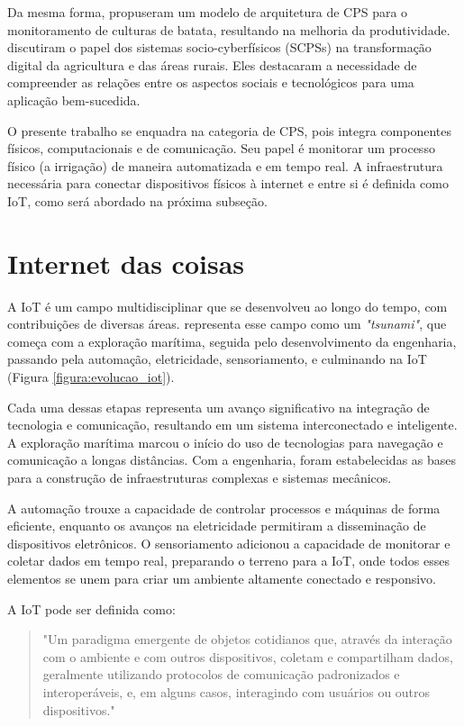 Da mesma forma, \textcite{rad2015smart} propuseram um modelo de arquitetura de CPS para o monitoramento de culturas de batata, resultando na melhoria da produtividade. \textcite{rijswijk2021digital} discutiram o papel dos sistemas socio-cyberfísicos (SCPSs) na transformação digital da agricultura e das áreas rurais. Eles destacaram a necessidade de compreender as relações entre os aspectos sociais e tecnológicos para uma aplicação bem-sucedida.

O presente trabalho se enquadra na categoria de CPS, pois integra componentes físicos, computacionais e de comunicação. Seu papel é monitorar um processo físico (a irrigação) de maneira automatizada e em tempo real. A infraestrutura necessária para conectar dispositivos físicos à internet e entre si é definida como IoT, como será abordado na próxima subseção. 

\section{Internet das coisas}
A IoT é um campo multidisciplinar que se desenvolveu ao longo do tempo, com contribuições de diversas áreas. \textcite{datta2017} representa esse campo como um \textit{"tsunami"}, que começa com a exploração marítima, seguida pelo desenvolvimento da engenharia, passando pela automação, eletricidade, sensoriamento, e culminando na IoT (Figura \ref{figura:evolucao_iot}). 

Cada uma dessas etapas representa um avanço significativo na integração de tecnologia e comunicação, resultando em um sistema interconectado e inteligente. A exploração marítima marcou o início do uso de tecnologias para navegação e comunicação a longas distâncias. Com a engenharia, foram estabelecidas as bases para a construção de infraestruturas complexas e sistemas mecânicos. 

A automação trouxe a capacidade de controlar processos e máquinas de forma eficiente, enquanto os avanços na eletricidade permitiram a disseminação de dispositivos eletrônicos. O sensoriamento adicionou a capacidade de monitorar e coletar dados em tempo real, preparando o terreno para a IoT, onde todos esses elementos se unem para criar um ambiente altamente conectado e responsivo.

A IoT pode ser definida como:

\begin{quote}
"Um paradigma emergente de objetos cotidianos que, através da interação com o ambiente e com outros dispositivos, coletam e compartilham dados, geralmente utilizando protocolos de comunicação padronizados e interoperáveis, e, em alguns casos, interagindo com usuários ou outros dispositivos." \parencite[{p. 44}]{kortuem2009things}
\end{quote}

